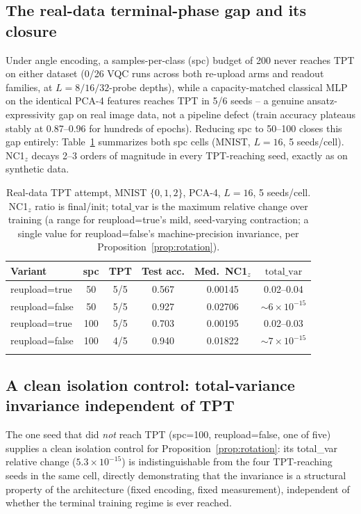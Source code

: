 \documentclass[pdflatex,sn-mathphys-ay]{sn-jnl}
\theoremstyle{thmstyleone}
\theoremstyle{thmstyletwo}
\begin{document}
\subsection{The real-data terminal-phase gap and its closure}
\label{sec:realdata-gap}

Under angle encoding, a samples-per-class (spc) budget of 200 never reaches TPT on either dataset (0/26 VQC runs across both re-upload arms and readout families, at $L=8/16/32$-probe depths), while a capacity-matched classical MLP on the identical PCA-4 features reaches TPT in 5/6 seeds -- a genuine ansatz-expressivity gap on real image data, not a pipeline defect (train accuracy plateaus stably at 0.87--0.96 for hundreds of epochs). Reducing spc to 50--100 closes this gap entirely: Table~\ref{tab:w1} summarizes both spc cells (MNIST, $L{=}16$, 5 seeds/cell). NC1$_z$ decays 2--3 orders of magnitude in every TPT-reaching seed, exactly as on synthetic data.

\begin{table}[t]
\centering
\caption{Real-data TPT attempt, MNIST $\{0,1,2\}$, PCA-4, $L{=}16$, 5 seeds/cell. NC1$_z$ ratio is final/init; $\mathrm{total\_var}$ is the maximum relative change over training (a range for reupload=true's mild, seed-varying contraction; a single value for reupload=false's machine-precision invariance, per Proposition~\ref{prop:rotation}).}
\label{tab:w1}
\begin{tabular}{@{}lccccc@{}}
\toprule
Variant & spc & TPT & Test acc. & Med.\ NC1$_z$ & $\mathrm{total\_var}$ \\
\midrule
reupload=true  & 50  & 5/5 & 0.567 & 0.00145 & 0.02--0.04 \\
reupload=false & 50  & 5/5 & 0.927 & 0.02706 & $\sim\!6{\times}10^{-15}$ \\
reupload=true  & 100 & 5/5 & 0.703 & 0.00195 & 0.02--0.03 \\
reupload=false & 100 & 4/5 & 0.940 & 0.01822 & $\sim\!7{\times}10^{-15}$ \\
\botrule
\end{tabular}
\end{table}

\subsection{A clean isolation control: total-variance invariance independent of TPT}
\label{sec:isolation}

The one seed that did \emph{not} reach TPT (spc=100, reupload=false, one of five) supplies a clean isolation control for Proposition~\ref{prop:rotation}: its total\_var relative change ($5.3\times10^{-15}$) is indistinguishable from the four TPT-reaching seeds in the same cell, directly demonstrating that the invariance is a structural property of the architecture (fixed encoding, fixed measurement), independent of whether the terminal training regime is ever reached.
\end{document}
